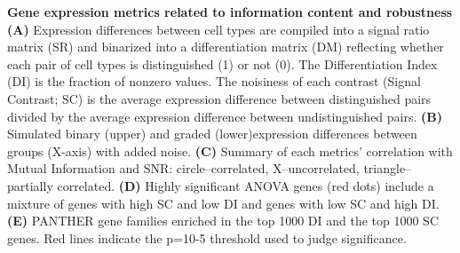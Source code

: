 \textbf{Gene expression metrics related to information content and robustness}
\textbf{(A)} Expression differences between cell types are compiled into a signal ratio matrix (SR) and binarized into a differentiation matrix (DM) reflecting whether each pair of cell types is distinguished (1) or not (0). The Differentiation Index (DI) is the fraction of nonzero values. The noisiness of each contrast (Signal Contrast; SC) is the average expression difference between distinguished pairs divided by the average expression difference between undistinguished pairs. 
\textbf{(B)} Simulated binary (upper) and graded (lower)expression differences between groups (X-axis) with added noise. 
\textbf{(C)} Summary of each metrics' correlation with Mutual Information and SNR: circle--correlated, X--uncorrelated, triangle--partially correlated.
\textbf{(D)} Highly significant ANOVA genes (red dots) include a mixture of genes with high SC and low DI and genes with low SC and high DI. 
\textbf{(E)} PANTHER gene families enriched in the top 1000 DI and the top 1000 SC genes. Red lines indicate the p=10-5 threshold used to judge significance.
